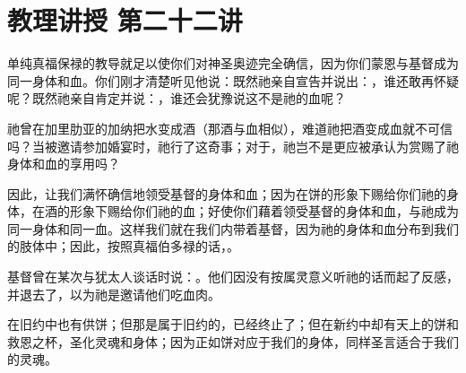 

\section{教理讲授 第二十二讲}

\par

\par

\par

\par

单纯真福保禄的教导就足以使你们对神圣奥迹完全确信，因为你们蒙恩与基督成为同一身体和血。你们刚才清楚听见他说：既然祂亲自宣告并说出：，谁还敢再怀疑呢？既然祂亲自肯定并说：，谁还会犹豫说这不是祂的血呢？\par

祂曾在加里肋亚的加纳把水变成酒（那酒与血相似），难道祂把酒变成血就不可信吗？当被邀请参加婚宴时，祂行了这奇事；对于，祂岂不是更应被承认为赏赐了祂身体和血的享用吗？\par

因此，让我们满怀确信地领受基督的身体和血；因为在饼的形象下赐给你们祂的身体，在酒的形象下赐给你们祂的血；好使你们藉着领受基督的身体和血，与祂成为同一身体和同一血。这样我们就在我们内带着基督，因为祂的身体和血分布到我们的肢体中；因此，按照真福伯多禄的话，。\par

基督曾在某次与犹太人谈话时说：。他们因没有按属灵意义听祂的话而起了反感，并退去了，以为祂是邀请他们吃血肉。\par

在旧约中也有供饼；但那是属于旧约的，已经终止了；但在新约中却有天上的饼和救恩之杯，圣化灵魂和身体；因为正如饼对应于我们的身体，同样圣言适合于我们的灵魂。\par

